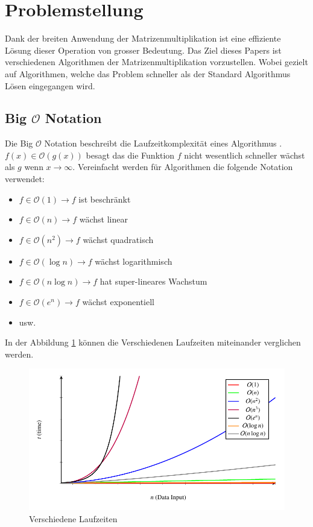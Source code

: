%
%
%
\section{Problemstellung}
Dank der breiten Anwendung der Matrizenmultiplikation ist eine effiziente L\"osung dieser Operation von grosser Bedeutung.
Das Ziel dieses Papers ist verschiedenen Algorithmen der Matrizenmultiplikation vorzustellen.
Wobei gezielt auf Algorithmen, welche das Problem schneller als der Standard Algorithmus L\"osen eingegangen wird.

\subsection{Big $\mathcal{O}$ Notation}
Die Big $\mathcal{O}$ Notation beschreibt die Laufzeitkomplexit\"at eines Algorithmus \cite{multiplikation:bigo}.
$f(x) \in \mathcal{O}(g(x))$ besagt das die Funktion $f$ nicht wesentlich schneller w\"achst als $g$ wenn $x \rightarrow \infty$.
Vereinfacht werden f\"ur Algorithmen die folgende Notation verwendet:
\begin{itemize}
	\item $f \in \mathcal{O}(1) \rightarrow f$ ist beschr\"ankt
	\item $f \in \mathcal{O}(n) \rightarrow f$ w\"achst linear
	\item $f \in \mathcal{O}(n^2) \rightarrow f$ w\"achst quadratisch
	\item $f \in \mathcal{O}(\log n) \rightarrow f$ w\"achst logarithmisch
	\item $f \in \mathcal{O}(n \log n) \rightarrow f$ hat super-lineares Wachstum
	\item $f \in \mathcal{O}(e^n) \rightarrow f$ w\"achst exponentiell
	\item usw.
\end{itemize}

In der Abbildung \ref{multiplikation:fig:bigo} k\"onnen die Verschiedenen Laufzeiten miteinander verglichen werden. 

\begin{figure}
	\center
	\includegraphics[]{papers/multiplikation/images/bigo}
	\caption{Verschiedene Laufzeiten}
	\label{multiplikation:fig:bigo}
\end{figure}

